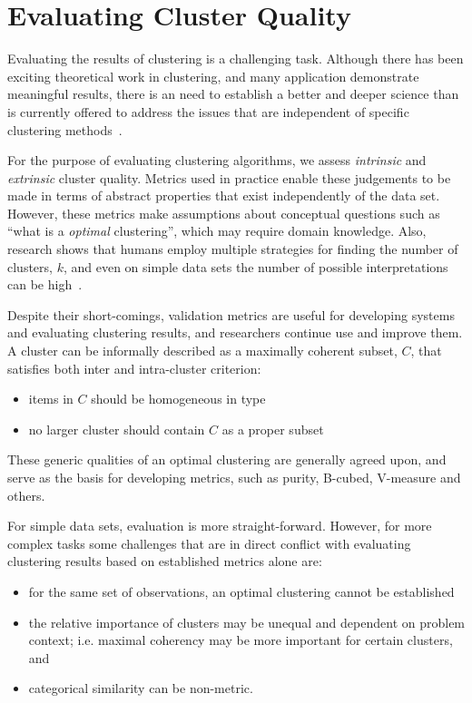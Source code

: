 \section{Evaluating Cluster Quality}
\label{sec:clusterEval}
Evaluating the results of clustering is a challenging task.  Although there has been exciting theoretical work in clustering, and many application demonstrate meaningful results, there is an need to establish a better and deeper science than is currently offered to address the issues that are independent of specific clustering methods~\cite{Pelillo,Guyon,Blum}.

For the purpose of evaluating clustering algorithms, we assess \emph{intrinsic} and \emph{extrinsic} cluster quality.  Metrics used in practice enable these judgements to be made in terms of abstract properties that exist independently of the data set.  However, these metrics make assumptions about conceptual questions such as ``what is a \emph{optimal} clustering'', which may require domain knowledge.  Also, research shows that humans employ multiple strategies for finding the number of clusters, $k$, and even on simple data sets the number of possible interpretations can be high~\cite{Lewis09}.

Despite their short-comings, validation metrics are useful for developing systems and evaluating clustering results, and researchers continue use and improve them.  A cluster can be informally described as a maximally coherent subset, $C$, that satisfies both inter and intra-cluster criterion:
\begin{itemize}
  \item items in $C$ should be homogeneous in type
  \item no larger cluster should contain $C$ as a proper subset
\end{itemize}
\noindent These generic qualities of an optimal clustering are generally agreed upon, and serve as the basis for developing metrics, such as purity, B-cubed, V-measure and others.

For simple data sets, evaluation is more straight-forward.  However, for more complex tasks some challenges that are in direct conflict with evaluating clustering results based on established metrics alone are:
\begin{itemize}
  \item for the same set of observations, an optimal clustering cannot be established
  \item the relative importance of clusters may be unequal and dependent on problem context; i.e. maximal coherency may be more important for certain clusters, and
  \item categorical similarity can be non-metric.
\end{itemize}

